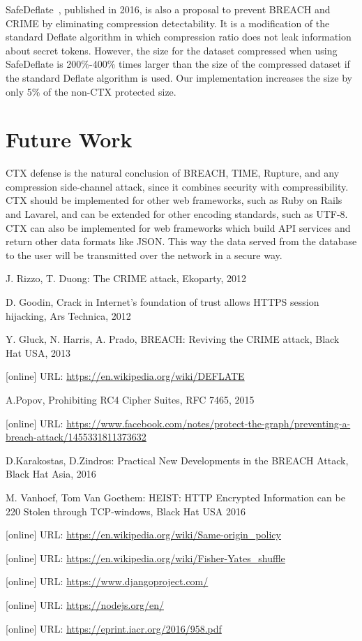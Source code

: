 \documentclass[a4paper, 11 pt, conference]{article}  %
\begin{document}
SafeDeflate~\cite{c16}, published in 2016, is also a proposal to prevent BREACH
and CRIME by eliminating compression detectability. It is a modification of the
standard Deflate algorithm in which compression ratio does not leak information
about secret tokens. However, the size for the dataset compressed when using
SafeDeflate is 200\%-400\% times larger than the size of the compressed dataset if the
standard Deflate algorithm is used. Our implementation increases the size by only 5\% of the non-CTX protected size.

\section{Future Work}
CTX defense is the natural conclusion of BREACH, TIME, Rupture, and any
compression side-channel attack, since it combines security with
compressibility. CTX should be implemented for other web frameworks, such as
Ruby on Rails and Lavarel, and can be extended for other encoding standards,
such as UTF-8. CTX can also be implemented for web frameworks which build API
services and return other data formats like JSON. This way the data served from
the database to the user will be transmitted over the network in a secure way.

\begin{thebibliography}{13}

 J. Rizzo, T. Duong: The CRIME attack, Ekoparty, 2012

 D. Goodin, Crack in Internet’s foundation of trust allows HTTPS session hijacking, Ars Technica, 2012

 Y. Gluck, N. Harris, A. Prado, BREACH: Reviving the CRIME attack, Black Hat USA, 2013

 [online] URL: \url{https://en.wikipedia.org/wiki/DEFLATE} 

 A.Popov, Prohibiting RC4 Cipher Suites, RFC 7465, 2015

 [online] URL: \url{https://www.facebook.com/notes/protect-the-graph/preventing-a-breach-attack/1455331811373632}

  D.Karakostas, D.Zindros: Practical New Developments in the BREACH Attack, Black Hat Asia, 2016

 M. Vanhoef, Tom Van Goethem: HEIST: HTTP Encrypted Information can be 220 Stolen through TCP-windows, Black Hat USA 2016

[online] URL: \url{https://en.wikipedia.org/wiki/Same-origin_policy} 

 [online] URL: \url{https://en.wikipedia.org/wiki/Fisher-Yates_shuffle}

 [online] URL: \url{https://www.djangoproject.com/} 

 [online] URL: \url{https://nodejs.org/en/} 

 [online] URL: \url{https://eprint.iacr.org/2016/958.pdf}

\end{thebibliography}
\end{document}
